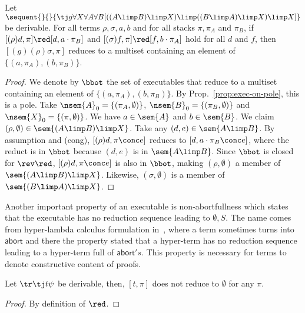 \begin{proposition}
 \label{prop:spec}
 Let
 $\sequent{}{}{\tj g
 {\forall X\forall A\forall B
 [((A\limp B)\limp X)
  \limp((B\limp A)\limp X)
  \limp X]}}$
 be
 derivable.
 For all terms $\rho,\sigma, a,b$ and for all stacks $\pi, \pi_A$ and
 $\pi_B$,
 if $[(\rho)d  ,\pi]\red [d,a\cdot \pi_B]$ and
    $[(\sigma)f,\pi]\red [f,b\cdot \pi_A]$ hold for all $d$ and $f$,
 then
 $[(g)(\rho)\sigma,\pi]$ reduces to a multiset containing an
 element of
 $\{(a,\pi_A),(b,\pi_B)\}$.
\end{proposition}
\begin{proof}
 We denote by $\bbot$ the set of executables that reduce to a multiset
 containing an element of $\{(a,\pi_A), (b,\pi_B)\}$.
 By Prop.~\ref{prop:exec-on-pole},
 this is a pole.
 Take $\nsem{A}_0 =\{(\pi_A,\emptyset)\}$, $\nsem{B}_0 =
 \{(\pi_B,\emptyset)\}$ and $\nsem{X}_0=\{(\pi,\emptyset)\}$.
 We have $a\in\sem{A}$ and $b\in\sem{B}$.
 We claim $(\rho,\emptyset)\in\sem{(A\limp B)\limp X}$.
 Take any $(d,e)\in\sem{A\limp B}$.
 By assumption and (cong),
 $[(\rho)d,\pi\conc e]$ reduces to $[d,a\cdot\pi_B\conc e]$,
 where the reduct is in $\bbot$ because $(d,e)$ is in $\sem{A\limp B}$.
 Since $\bbot$ is closed for $\rev\red$,
 $[(\rho)d,\pi\conc e]$ is also in $\bbot$, making
 $(\rho,\emptyset)$ a member of $\sem{(A\limp B)\limp X}$.
 Likewise,
 $(\sigma,\emptyset)$ is a member of $\sem{(B\limp A)\limp X}$.
\end{proof}


Another important property of an executable is
non-abortfullness
which states that the executable has no reduction sequence leading to
$\emptyset,S$.
The name comes from hyper-lambda calculus formulation in~\citep{hiraiflops2012},
where a term sometimes turns into $\mathsf{abort}$ and there the property
stated that a hyper-term has no reduction sequence leading to a hyper-term
full of $\mathsf{abort}'s$.
This property is necessary for terms to denote
constructive content of proofs.

\begin{proposition}
 Let $\tr\tj t\psi$ be derivable, then,
 $[t,\pi]$ does not reduce to $\emptyset$ for
 any $\pi$.
\end{proposition}
\begin{proof}
 By definition of $\red$.
\end{proof}

